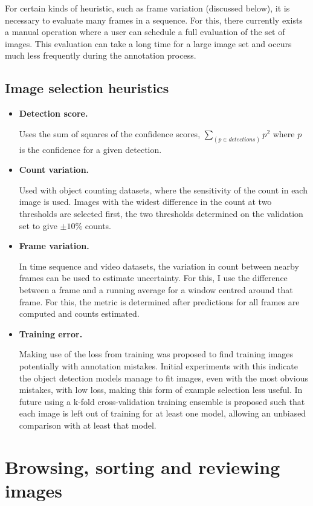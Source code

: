 For certain kinds of heuristic, such as frame variation (discussed below), it is necessary to evaluate many frames in a sequence. For this, there currently exists a manual operation where a user can schedule a full evaluation of the set of images. This evaluation can take a long time for a large image set and occurs much less frequently during the annotation process.


\subsection {Image selection heuristics}
\begin{itemize}
\item {\bf Detection score. }

Uses the sum of squares of the confidence scores, $ \sum_(p \in detections){ p^2 } $ where $p$ is the confidence for a given detection. 

    \item {\bf Count variation. } \par
Used with object counting datasets, where the sensitivity of the count in each image is used. Images with the widest difference in the count at two thresholds are selected first, the two thresholds determined on the validation set to give $ \pm 10\% $ counts.
    \item {\bf Frame variation. }  \par
In time sequence and video datasets, the variation in count between nearby frames can be used to estimate uncertainty. For this, I use the difference between a frame and a running average for a window centred around that frame. For this, the metric is determined after predictions for all frames are computed and counts estimated.
    \item {\bf Training error. }  \par
Making use of the loss from training was proposed to find training images potentially with annotation mistakes. Initial experiments with this indicate the object detection models manage to fit images, even with the most obvious mistakes, with low loss, making this form of example selection less useful. In future using a k-fold cross-validation training ensemble is proposed such that each image is left out of training for at least one model, allowing an unbiased comparison with at least that model.
\end{itemize}


\section{Browsing, sorting and reviewing images}
\label{sec:browising}


